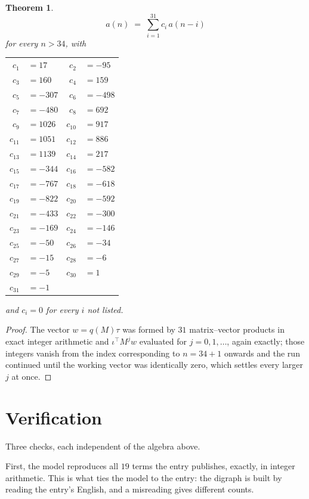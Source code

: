 \documentclass[11pt,a4paper]{article}
\theoremstyle{plain}
\newtheorem{theorem}{Theorem}
\theoremstyle{definition}
\begin{document}
\begin{theorem}
\[
a(n)\;=\;\sum_{i=1}^{31}c_i\,a(n-i)
\]
for every $n>34$, with
\begin{center}\footnotesize
\begin{tabular}{r@{\,}l@{\qquad}r@{\,}l}
$c_{1}$ & $=17$ & $c_{2}$ & $=-95$ \\
$c_{3}$ & $=160$ & $c_{4}$ & $=159$ \\
$c_{5}$ & $=-307$ & $c_{6}$ & $=-498$ \\
$c_{7}$ & $=-480$ & $c_{8}$ & $=692$ \\
$c_{9}$ & $=1026$ & $c_{10}$ & $=917$ \\
$c_{11}$ & $=1051$ & $c_{12}$ & $=886$ \\
$c_{13}$ & $=1139$ & $c_{14}$ & $=217$ \\
$c_{15}$ & $=-344$ & $c_{16}$ & $=-582$ \\
$c_{17}$ & $=-767$ & $c_{18}$ & $=-618$ \\
$c_{19}$ & $=-822$ & $c_{20}$ & $=-592$ \\
$c_{21}$ & $=-433$ & $c_{22}$ & $=-300$ \\
$c_{23}$ & $=-169$ & $c_{24}$ & $=-146$ \\
$c_{25}$ & $=-50$ & $c_{26}$ & $=-34$ \\
$c_{27}$ & $=-15$ & $c_{28}$ & $=-6$ \\
$c_{29}$ & $=-5$ & $c_{30}$ & $=1$ \\
$c_{31}$ & $=-1$ \\
\end{tabular}
\end{center}
and $c_i=0$ for every $i$ not listed.
\end{theorem}

\begin{proof}
The vector $w=q(M)\tau$ was formed by $31$ matrix--vector products in exact integer
arithmetic and $\iota^{\!\top}M^{j}w$ evaluated for $j=0,1,\dots$, again exactly; those
integers vanish from the index corresponding to $n=34+1$ onwards and the run continued
until the working vector was identically zero, which settles every larger $j$ at once.
\end{proof}

\section{Verification}

Three checks, each independent of the algebra above.

First, the model reproduces all $19$ terms the entry publishes, exactly, in integer
arithmetic. This is what ties the model to the entry: the digraph is built by reading the
entry's English, and a misreading gives different counts.
\end{document}
